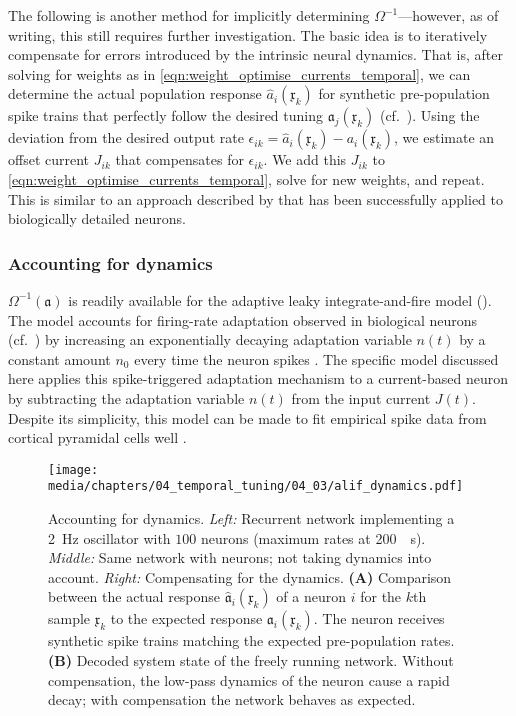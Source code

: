 The following is another method for implicitly determining $\Omega^{-1}$---however, as of writing, this still requires further investigation.
The basic idea is to iteratively compensate for errors introduced by the intrinsic neural dynamics.
That is, after solving for weights as in \cref{eqn:weight_optimise_currents_temporal}, we can determine the actual population response $\hat a_i(\mathfrak{x}_k)$ for synthetic pre-population spike trains that perfectly follow the desired tuning $\mathfrak{a}_j(\mathfrak{x}_k)$ (cf.~).
Using the deviation from the desired output rate $\epsilon_{ik} = \hat a_i(\mathfrak{x}_k) - a_i(\mathfrak{x}_k)$, we estimate an offset current $J_{ik}$ that compensates for $\epsilon_{ik}$.
We add this $J_{ik}$ to \cref{eqn:weight_optimise_currents_temporal}, solve for new weights, and repeat.
This is similar to an approach described by \citet{duggins2017incorporating} that has been successfully applied to biologically detailed neurons.

\subsubsection{Accounting for \ALIF dynamics}
$\Omega^{-1}(\mathfrak{a})$ is readily available for the adaptive leaky integrate-and-fire model (\ALIF).
The \ALIF model accounts for firing-rate adaptation observed in biological neurons (cf.~) by increasing an exponentially decaying adaptation variable $n(t)$ by a constant amount $n_0$ every time the neuron spikes \citep{treves1993meanfield}.
The specific \ALIF model discussed here applies this spike-triggered adaptation mechanism to a current-based \LIF neuron by subtracting the adaptation variable $n(t)$ from the input current $J(t)$.
Despite its simplicity, this model can be made to fit empirical spike data from cortical pyramidal cells well \citep{camera2004minimal}.

\begin{figure}
	\texttt{[image: media/chapters/04\_temporal\_tuning/04\_03/alif\_dynamics.pdf]}%
	{\label{fig:alif_a}}%
	{\label{fig:alif_b}}%
	\caption[Accounting for ALIF dynamics]{
		Accounting for \ALIF dynamics.
		\emph{Left:} Recurrent network implementing a \SI{2}{\hertz} oscillator with $100$ \LIF neurons (maximum rates at \SI{200}{\per\second}).
		\emph{Middle:} Same network with \ALIF neurons; not taking dynamics into account.
		\emph{Right:} Compensating for the \ALIF dynamics.
		\textbf{(A)} Comparison between the actual response $\hat{\mathfrak{a}}_i(\mathfrak{x}_k)$ of a neuron $i$ for the $k$th sample $\mathfrak{x}_k$ to the expected response $\mathfrak{a}_i(\mathfrak{x}_k)$.
		The neuron receives synthetic spike trains matching the expected pre-population rates.
		\textbf{(B)} Decoded system state of the freely running network. Without compensation, the low-pass dynamics of the \ALIF neuron cause a rapid decay; with compensation the network behaves as expected.
	}
	\label{fig:alif}
\end{figure}

